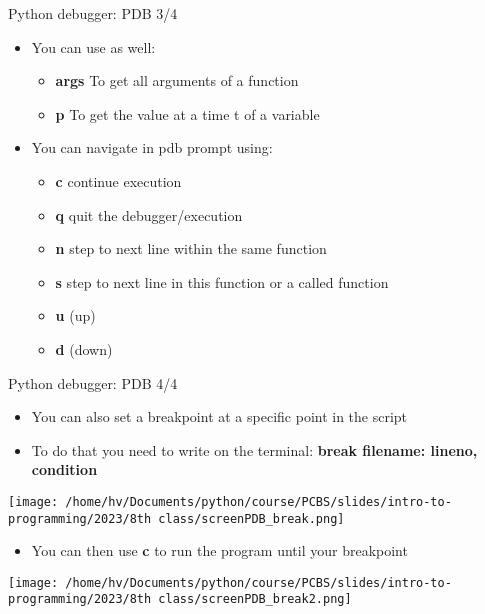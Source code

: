 \documentclass[
  8pt,
  ignorenonframetext,
]{beamer}
\providecommand{\tightlist}{%
  \setlength{\itemsep}{0pt}\setlength{\parskip}{0pt}}
\begin{document}
\begin{frame}{Python debugger: PDB 3/4}
\protect\hypertarget{python-debugger-pdb-34}{}
\begin{itemize}
\tightlist
\item
  You can use as well:

  \begin{itemize}
  \tightlist
  \item
    \textbf{args} To get all arguments of a function
  \item
    \textbf{p} To get the value at a time t of a variable
  \end{itemize}
\item
  You can navigate in pdb prompt using:

  \begin{itemize}
  \tightlist
  \item
    \textbf{c} continue execution
  \item
    \textbf{q} quit the debugger/execution
  \item
    \textbf{n} step to next line within the same function
  \item
    \textbf{s} step to next line in this function or a called function
  \item
    \textbf{u} (up)
  \item
    \textbf{d} (down)
  \end{itemize}
\end{itemize}
\end{frame}

\begin{frame}{Python debugger: PDB 4/4}
\protect\hypertarget{python-debugger-pdb-44}{}
\begin{itemize}
\item
  You can also set a breakpoint at a specific point in the script
\item
  To do that you need to write on the terminal: \textbf{break filename:
  lineno, condition}
\end{itemize}

\texttt{[image: /home/hv/Documents/python/course/PCBS/slides/intro-to-programming/2023/8th class/screenPDB\_break.png]}

\begin{itemize}
\tightlist
\item
  You can then use \textbf{c} to run the program until your breakpoint
\end{itemize}

\texttt{[image: /home/hv/Documents/python/course/PCBS/slides/intro-to-programming/2023/8th class/screenPDB\_break2.png]}
\end{frame}
\end{document}
